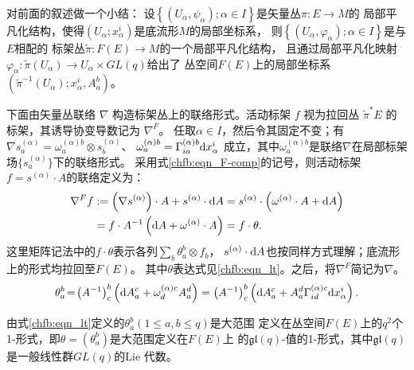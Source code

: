 对前面的叙述做一个小结：
设$\left\{\left(U_{\alpha}, \psi_{\alpha}\right) ; \alpha \in I\right\}$是矢量丛$\pi: E \rightarrow M$的
局部平凡化结构，使得$\left(U_{\alpha} ; x_{\alpha}^{i}\right)$是底流形$M$的局部坐标系，
则$\left\{\left(U_{\alpha}, \varphi_{\alpha}\right) ; \alpha \in I\right\}$是与$E$相配的
标架丛$\tilde{\pi}: F(E) \rightarrow M$的一个局部平凡化结构，
且通过局部平凡化映射$\varphi_{\alpha}: \tilde{\pi}\left(U_{\alpha}\right) \rightarrow U_{\alpha} \times GL(q)$给出了
丛空间$F(E)$上的局部坐标系$\left(\tilde{\pi}^{-1}\left(U_{\alpha}\right) ; x_{\alpha}^{i}, A_{a}^{b}\right)$。

下面由矢量丛联络 $\nabla$ 构造标架丛上的联络形式。活动标架 $f$ 视为拉回丛 $\tilde\pi^*E$ 的标架，其诱导协变导数记为 $\nabla^F$。
任取$\alpha \in I$，然后令其固定不变；有
$ \nabla s_{a}^{(\alpha)}=\omega_{a}^{(\alpha) b}\otimes s_{b}^{(\alpha)}$、
$ \omega_{a}^{(\alpha) b}=\Gamma^{(\alpha) b}_{i a} \dd x_{\alpha}^{i} $
成立，其中$\omega_{a}^{(\alpha) b}$是联络$\nabla$在局部标架场$\{s_{a}^{(\alpha)}\}$下的联络形式。
采用式\eqref{chfb:eqn_F-comp}的记号，则活动标架$f=s^{(\alpha)} \cdot A$的联络定义为：
\begin{equation}
\begin{aligned}
    \nabla^F f & :=\left(\nabla s^{(\alpha)}\right) \cdot A + s^{(\alpha)} \cdot \dd A
    =s^{(\alpha)} \cdot \left(\omega^{(\alpha)} \cdot A+\dd A\right)  \\
    & =f \cdot A^{-1}\left(\dd A+\omega^{(\alpha)} \cdot A\right)
    =f \cdot \theta .
\end{aligned}\end{equation}
这里矩阵记法中的$f\cdot\theta$表示各列$\sum_b\theta^b_a\otimes f_b$，
$s^{(\alpha)}\cdot\dd A$也按同样方式理解；底流形上的形式均拉回至$F(E)$。
其中$\theta$表达式见\eqref{chfb:eqn_lt}。之后，将$\nabla^F$简记为$\nabla$。
\begin{equation}\label{chfb:eqn_lt}
    \theta_{a}^{b}\! =\! \left(A^{-1}\right)_{c}^{b}
    \left(\dd A_{a}^{c}+\omega_{d}^{(\alpha) c} A_{a}^{d} \right)
    =\left(A^{-1}\right)_{c}^{b}\left(\dd A_{a}^{c}+A_{a}^{d}
     \Gamma^{(\alpha) c}_{i d} \dd x_{\alpha}^{i}\right) .
\end{equation}

\begin{theorem}
由式\eqref{chfb:eqn_lt}定义的$\theta_{a}^{b} (1 \leqslant a,b \leqslant q)$是大范围
定义在丛空间$F(E)$上的$q^{2}$个1-形式，即$\theta=(\theta_{a}^{b})$是大范围定义在$F(E)$上
的$\mathfrak{g l}(q)$-值的1-形式，其中$\mathfrak{gl}(q)$是一般线性群$GL(q)$的Lie 代数。
\end{theorem}

